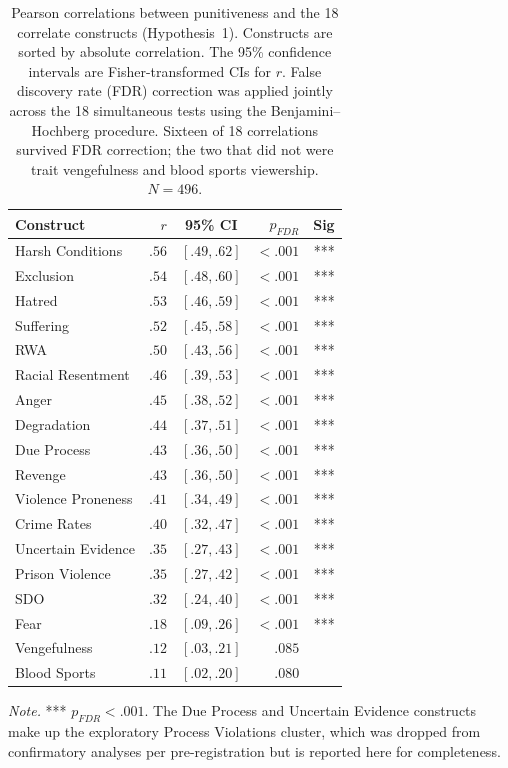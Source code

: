 \begin{table}[htbp]
  \centering
  \caption{Pearson correlations between punitiveness and the 18 correlate constructs (Hypothesis~1). Constructs are sorted by absolute correlation. The 95\% confidence intervals are Fisher-transformed CIs for $r$. False discovery rate (FDR) correction was applied jointly across the 18 simultaneous tests using the Benjamini--Hochberg procedure. Sixteen of 18 correlations survived FDR correction; the two that did not were trait vengefulness and blood sports viewership. $N = 496$.}
  \label{tab:H1_correlations}
  \small
  \begin{tabular}{lrcrr}
    \toprule
    Construct & $r$ & 95\% CI & $p_\textit{FDR}$ & Sig \\
    \midrule
    Harsh Conditions     & $.56$ & $[.49, .62]$ & $<.001$ & *** \\
    Exclusion            & $.54$ & $[.48, .60]$ & $<.001$ & *** \\
    Hatred               & $.53$ & $[.46, .59]$ & $<.001$ & *** \\
    Suffering            & $.52$ & $[.45, .58]$ & $<.001$ & *** \\
    RWA                  & $.50$ & $[.43, .56]$ & $<.001$ & *** \\
    Racial Resentment    & $.46$ & $[.39, .53]$ & $<.001$ & *** \\
    Anger                & $.45$ & $[.38, .52]$ & $<.001$ & *** \\
    Degradation          & $.44$ & $[.37, .51]$ & $<.001$ & *** \\
    Due Process          & $.43$ & $[.36, .50]$ & $<.001$ & *** \\
    Revenge              & $.43$ & $[.36, .50]$ & $<.001$ & *** \\
    Violence Proneness   & $.41$ & $[.34, .49]$ & $<.001$ & *** \\
    Crime Rates          & $.40$ & $[.32, .47]$ & $<.001$ & *** \\
    Uncertain Evidence   & $.35$ & $[.27, .43]$ & $<.001$ & *** \\
    Prison Violence      & $.35$ & $[.27, .42]$ & $<.001$ & *** \\
    SDO                  & $.32$ & $[.24, .40]$ & $<.001$ & *** \\
    Fear                 & $.18$ & $[.09, .26]$ & $<.001$ & *** \\
    Vengefulness         & $.12$ & $[.03, .21]$ & $.085$  & \\
    Blood Sports         & $.11$ & $[.02, .20]$ & $.080$  & \\
    \bottomrule
  \end{tabular}

  \vspace{0.5em}
  \footnotesize
  \textit{Note.} *** $p_\textit{FDR} < .001$. The Due Process and Uncertain Evidence constructs make up the exploratory Process Violations cluster, which was dropped from confirmatory analyses per pre-registration but is reported here for completeness.
\end{table}
